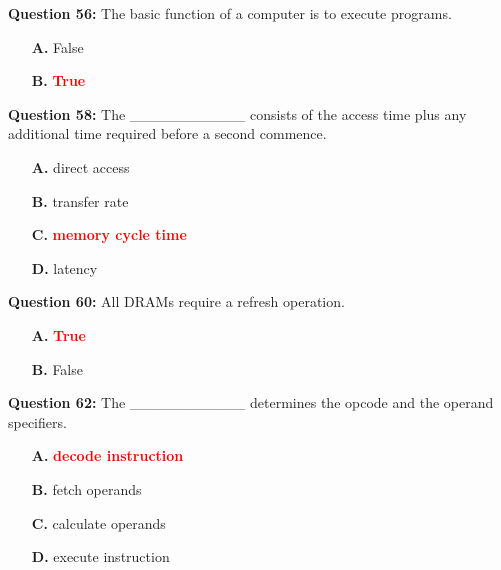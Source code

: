 \documentclass[12pt,a4paper]{article}
\begin{document}
\vspace{0.5cm}

\textbf{Question 56:} The basic function of a computer is to execute programs.

\begin{itemize}
    \item[\textbf{A.}] False
    \item[\textbf{B.}] \textcolor{red}{\textbf{True}}
\end{itemize}

\vspace{0.5cm}

\textbf{Question 58:} The ___________ consists of the access time plus any additional time required before a second commence.

\begin{itemize}
    \item[\textbf{A.}] direct access
    \item[\textbf{B.}] transfer rate
    \item[\textbf{C.}] \textcolor{red}{\textbf{memory cycle time}}
    \item[\textbf{D.}] latency
\end{itemize}

\vspace{0.5cm}

\textbf{Question 60:} All DRAMs require a refresh operation.

\begin{itemize}
    \item[\textbf{A.}] \textcolor{red}{\textbf{True}}
    \item[\textbf{B.}] False
\end{itemize}

\vspace{0.5cm}

\textbf{Question 62:} The ___________ determines the opcode and the operand specifiers.

\begin{itemize}
    \item[\textbf{A.}] \textcolor{red}{\textbf{decode instruction}}
    \item[\textbf{B.}] fetch operands
    \item[\textbf{C.}] calculate operands
    \item[\textbf{D.}] execute instruction
\end{itemize}

\vspace{0.5cm}
\end{document}
